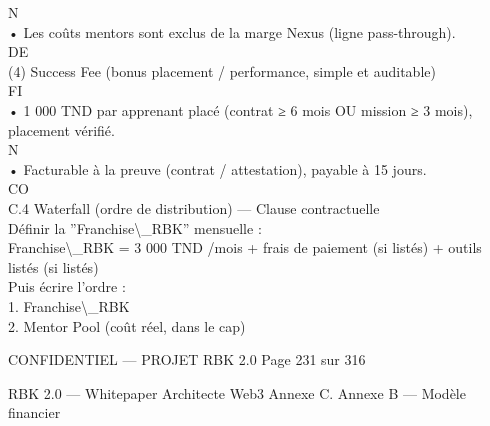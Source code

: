 \vspace{0.5em}
N\\
• Les coûts mentors sont exclus de la marge Nexus (ligne pass-through).\\
\vspace{0.5em}
\vspace{0.5em}
\vspace{0.5em}
\vspace{0.5em}
DE\\
(4) Success Fee (bonus placement / performance, simple et auditable)\\
\vspace{0.5em}
\vspace{0.5em}
\vspace{0.5em}
\vspace{0.5em}
FI\\
• 1 000 TND par apprenant placé (contrat ≥ 6 mois OU mission ≥ 3 mois), placement vérifié.\\
\vspace{0.5em}
\vspace{0.5em}
\vspace{0.5em}
N\\
• Facturable à la preuve (contrat / attestation), payable à 15 jours.\\
CO\\
C.4 Waterfall (ordre de distribution) — Clause contractuelle\\
Définir la ”Franchise\textbackslash{}_RBK” mensuelle :\\
\vspace{0.5em}
Franchise\textbackslash{}_RBK = 3 000 TND /mois + frais de paiement (si listés) + outils listés (si listés)\\
\vspace{0.5em}
Puis écrire l’ordre :\\
\vspace{0.5em}
1. Franchise\textbackslash{}_RBK\\
\vspace{0.5em}
2. Mentor Pool (coût réel, dans le cap)\\
\vspace{0.5em}
\vspace{0.5em}
\vspace{0.5em}
\begin{confidential}CONFIDENTIEL — PROJET RBK 2.0                                               Page 231 sur 316\end{confidential}
RBK 2.0 — Whitepaper Architecte Web3                           Annexe C. Annexe B — Modèle financier\\
